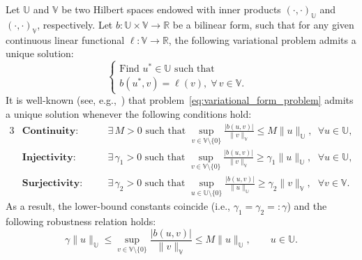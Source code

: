 \documentclass{article}
\theoremstyle{definition}
\begin{document}
Let $\mathbb{U}$ and $\mathbb{V}$ be two Hilbert spaces endowed with inner products $(\cdot,\cdot)_{\mathbb{U}}$ and $(\cdot,\cdot)_{\mathbb{V}}$, respectively.
Let $b:\mathbb{U}\times\mathbb{V}\longrightarrow\mathbb{R}$ be a bilinear form, such that for any given continuous linear functional $\ell : \mathbb{V}\longrightarrow\mathbb{R}$, the following variational problem admits a unique solution:
\begin{equation}
    \left\{
    \begin{array}{ll}
    \text{Find } u^* \in \mathbb{U} \text{ such that} & \\
        b(u^*,v) = \ell(v),\;\forall\, v\in \mathbb{V}.
\end{array}
    \right.
    \label{eq:variational_form_problem}
\end{equation}
It is well-known (see, e.g.,~\cite[Theorem 25.9]{ErnGuermond2021_FiniteElementsII}) that problem~\eqref{eq:variational_form_problem} admits a unique solution whenever the following conditions hold:
\begin{alignat}{3}
&\textbf{Continuity:}& \quad &\exists\, M>0 \text{ such that } \sup_{v \in \mathbb{V} \setminus \{0\}} \frac{|b(u,v)|}{\|v\|_\mathbb{V}} \leq M \|u\|_\mathbb{U}, \quad &&\forall u \in \mathbb{U},\label{eq:continuity} \\
&\textbf{Injectivity:}& \quad &\exists\, \gamma_1>0 \text{ such that } \sup_{v \in \mathbb{V} \setminus \{0\}} \frac{|b(u,v)|}{\|v\|_\mathbb{V}} \geq \gamma_1 \|u\|_\mathbb{U}, \quad &&\forall u \in \mathbb{U}, \label{eq:inf-sup} \\
&\textbf{Surjectivity:}& \quad &\exists\, \gamma_2>0 \text{ such that } \sup_{u \in \mathbb{U} \setminus \{0\}} \frac{|b(u,v)|}{\|u\|_\mathbb{U}} \geq \gamma_2 \|v\|_\mathbb{V}, \quad &&\forall v \in \mathbb{V}. \label{eq:surjectivity}
\end{alignat}
As a result, the lower-bound constants coincide (i.e., $\gamma_1 
= \gamma_2 =:\gamma$) and the following robustness relation holds:
\begin{equation}\label{eq:dual_inf-sup}
\gamma \|u\|_\mathbb{U} \leq \sup_{v\in\mathbb{V}\setminus\{0\}} \frac{|b(u,v)|}{\|v\|_\mathbb{V}} \leq M \|u\|_\mathbb{U},\qquad u\in\mathbb{U}.
\end{equation}
\end{document}
